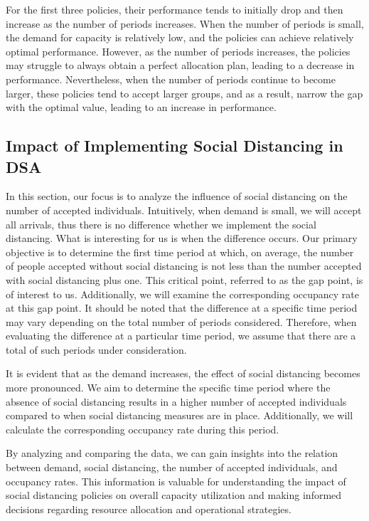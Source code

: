 For the first three policies, their performance tends to initially drop and then increase as the number of periods increases. When the number of periods is small, the demand for capacity is relatively low, and the policies can achieve relatively optimal performance. However, as the number of periods increases, the policies may struggle to always obtain a perfect allocation plan, leading to a decrease in performance. Nevertheless, when the number of periods continue to become larger, these policies tend to accept larger groups, and as a result, narrow the gap with the optimal value, leading to an increase in performance.


\subsection{Impact of Implementing Social Distancing in DSA}
In this section, our focus is to analyze the influence of social distancing on the number of accepted individuals. Intuitively, when demand is small, we will accept all arrivals, thus there is no difference whether we implement the social distancing. What is interesting for us is when the difference occurs. Our primary objective is to determine the first time period at which, on average, the number of people accepted without social distancing is not less than the number accepted with social distancing plus one. This critical point, referred to as the gap point, is of interest to us. Additionally, we will examine the corresponding occupancy rate at this gap point. It should be noted that the difference at a specific time period may vary depending on the total number of periods considered. Therefore, when evaluating the difference at a particular time period, we assume that there are a total of such periods under consideration.


It is evident that as the demand increases, the effect of social distancing becomes more pronounced. We aim to determine the specific time period where the absence of social distancing results in a higher number of accepted individuals compared to when social distancing measures are in place. Additionally, we will calculate the corresponding occupancy rate during this period.

By analyzing and comparing the data, we can gain insights into the relation between demand, social distancing, the number of accepted individuals, and occupancy rates. This information is valuable for understanding the impact of social distancing policies on overall capacity utilization and making informed decisions regarding resource allocation and operational strategies.

